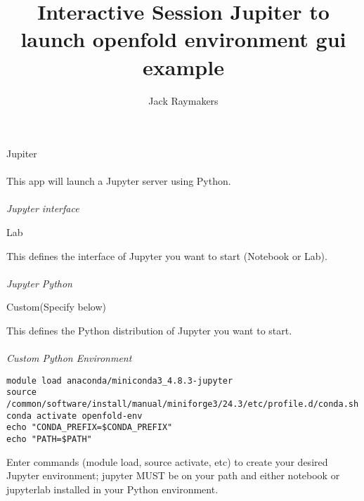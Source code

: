 \documentclass[]{article}
\title{Interactive Session Jupiter to launch openfold environment gui example}
\author{Jack Raymakers}
\begin{document}
\maketitle
\vspace{-20pt} 
\setlength\parindent{0pt}
Jupiter\\
\\
This app will launch a Jupyter server using Python.\\\\
\emph{Jupyter interface}
\begin{tcolorbox}[colback=white,colframe=gray!75!black]{
		Lab
}
\end{tcolorbox}
This defines the interface of Jupyter you want to start (Notebook or Lab).\\\\
\emph{Jupyter Python}
\begin{tcolorbox}[colback=white,colframe=gray!75!black]{
Custom(Specify below)
}
\end{tcolorbox}

This defines the Python distribution of Jupyter you want to start.\\\\

\emph{Custom Python Environment}
\begin{tcolorbox}[colback=white,colframe=gray!75!black]{
\begin{verbatim}
module load anaconda/miniconda3_4.8.3-jupyter
source /common/software/install/manual/miniforge3/24.3/etc/profile.d/conda.sh
conda activate openfold-env
echo "CONDA_PREFIX=$CONDA_PREFIX"
echo "PATH=$PATH"
\end{verbatim}	
	}
\end{tcolorbox}
Enter commands (module load, source activate, etc) to create your desired Jupyter environment; jupyter MUST be on your path and either notebook or jupyterlab installed in your Python environment.\\\\
\end{document}
